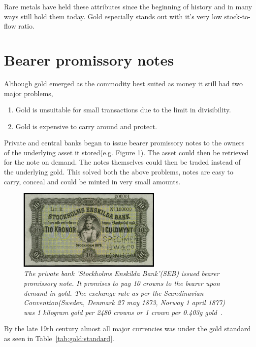 Rare metals have held these attributes since the beginning of history and in many ways still hold them today. Gold especially stands out with it's very low stock-to-flow ratio.

\section{Bearer promissory notes}

Although gold emerged as the commodity best suited as money it still had two major problems,

\begin{enumerate}
	\item Gold is unsuitable for small transactions due to the limit in divisibility.
	\item Gold is expensive to carry around and protect.
\end{enumerate}

Private and central banks began to issue bearer promissory notes to the owners of the underlying asset it stored(e.g. Figure \ref{fig:seb:promissory:note}). 
The asset could then be retrieved for the note on demand. The notes themselves could then be traded instead of the underlying gold. This solved both the above problems, notes are easy to carry, conceal and could be minted in very small amounts. 

\begin{figure}[!htb]

	\centering
	\includegraphics[width=7cm]{external/PrivateBankNoteStockholmEnskildaBank1876.JPG}
	\caption{\textit{The private bank 'Stockholms Enskilda Bank'(SEB) issued bearer
	promissory note. It promises to pay 10 crowns to the bearer upon demand in gold. 
	The exchange rate as per the Scandinavian Convention(Sweden, Denmark 27 may 1873, Norway 1 april 1877)\cite{nordic:crown}
	was 1 kilogram gold per 2480 crowns or 1 crown per 0.403g gold~\cite{crown:gold}. 
 }}
	\label{fig:seb:promissory:note}
\end{figure}

By the late 19th century almost all major currencies was under the gold standard as seen in Table~\ref{tab:gold:standard}.

